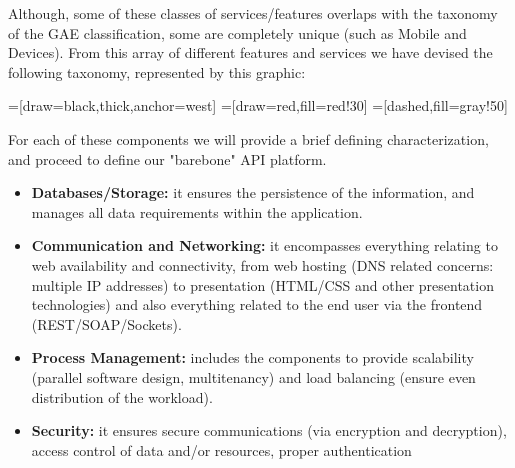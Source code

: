 \documentclass[11pt]{amsart}
\begin{document}
\begin{enumarate}
          Although, some of these classes of services/features overlaps with the taxonomy
          of the GAE classification, some are completely unique (such as Mobile and
          Devices). From this array of different features and services we have devised the
          following taxonomy, represented by this graphic:          
          \begin{center}
              =[draw=black,thick,anchor=west]
              =[draw=red,fill=red!30]
              =[dashed,fill=gray!50]
          \end{center}
          For each of these components we will provide a brief defining characterization,
          and proceed to define our "barebone" API platform.
          \begin{itemize}
            \item \textbf{Databases/Storage:} it ensures the persistence of the
              information, and manages all data requirements within the application.
            \item \textbf{Communication and Networking:} it encompasses everything
              relating to web availability and connectivity, from web hosting (DNS related
              concerns: multiple IP addresses) to presentation (HTML/CSS and other
              presentation technologies) and also everything related to the end user via
              the frontend (REST/SOAP/Sockets).
            \item \textbf{Process Management:} includes the
              components to provide scalability (parallel software design, multitenancy) and
              load balancing (ensure even distribution of the workload).
            \item \textbf{Security:} it ensures secure communications (via encryption and
              decryption), access control of data and/or resources, proper authentication

\end{itemize}
\end{enumarate}
\end{document}
